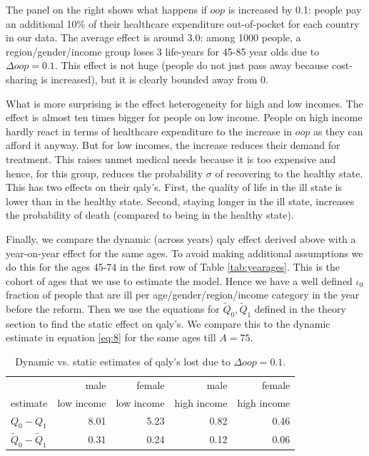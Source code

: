 \documentclass[a4paper,12pt]{article}
\begin{document}
The panel on the right shows what happens if \(oop\) is increased by 0.1: people pay an additional 10\% of their healthcare expenditure out-of-pocket for each country in our data. The average effect is around 3.0: among 1000 people, a region/gender/income group loses 3 life-years for 45-85 year olds due to \(\Delta oop=0.1\). This effect is not huge (people do not just pass away because cost-sharing is increased), but it is clearly bounded away from 0.

What is more surprising is the effect heterogeneity for high and low incomes. The effect is almost ten times bigger for people on low income. People on high income hardly react in terms of healthcare expenditure to the increase in \(oop\) as they can afford it anyway. But for low incomes, the increase reduces their demand for treatment. This raises unmet medical needs because it is too expensive and hence, for this group, reduces the probability \(\sigma\) of recovering to the healthy state. This has two effects on their qaly's. First, the quality of life in the ill state is lower than in the healthy state. Second, staying longer in the ill state, increases the probability of death (compared to being in the healthy state).


Finally, we compare the dynamic (across years) qaly effect derived above with a year-on-year effect for the same ages. To avoid making additional assumptions we do this for the ages 45-74 in the first row of Table \ref{tab:yearages}. This is the cohort of ages that we use to estimate the model. Hence we have a well defined \(\iota_0\) fraction of people that are ill per age/gender/region/income category in the year before the reform. Then we use the equations for \(\tilde Q_0, \tilde Q_1\) defined in the theory section to find the static effect on qaly's. We compare this to the dynamic estimate in equation \eqref{eq:8} for the same ages till \(A=75\).


\begin{table}[htbp]
\caption{\label{tab:dynamic_static}Dynamic vs. static estimates of qaly's lost due to \(\Delta oop = 0.1\).}
\centering
\begin{tabular}{lrrrr}
 & male & female & male & female\\
estimate & low income & low income & high income & high income\\
\hline
\(Q_0 - Q_1\) & 8.01 & 5.23 & 0.82 & 0.46\\
\(\tilde Q_0 - \tilde Q_1\) & 0.31 & 0.24 & 0.12 & 0.06\\
\end{tabular}
\end{table}
\end{document}
